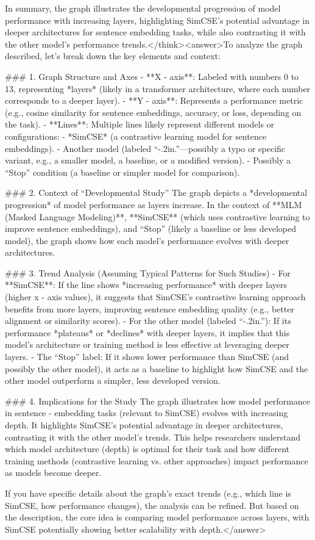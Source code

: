 In summary, the graph illustrates the developmental progression of model performance with increasing layers, highlighting SimCSE's potential advantage in deeper architectures for sentence embedding tasks, while also contrasting it with the other model's performance trends.</think><answer>To analyze the graph described, let’s break down the key elements and context:  


### 1. Graph Structure and Axes  
- **X - axis**: Labeled with numbers 0 to 13, representing *layers* (likely in a transformer architecture, where each number corresponds to a deeper layer).  
- **Y - axis**: Represents a performance metric (e.g., cosine similarity for sentence embeddings, accuracy, or loss, depending on the task).  
- **Lines**: Multiple lines likely represent different models or configurations:  
  - *SimCSE* (a contrastive learning model for sentence embeddings).  
  - Another model (labeled “-.2in.”—possibly a typo or specific variant, e.g., a smaller model, a baseline, or a modified version).  
  - Possibly a “Stop” condition (a baseline or simpler model for comparison).  


### 2. Context of “Developmental Study”  
The graph depicts a *developmental progression* of model performance as layers increase. In the context of **MLM (Masked Language Modeling)**, **SimCSE** (which uses contrastive learning to improve sentence embeddings), and “Stop” (likely a baseline or less developed model), the graph shows how each model’s performance evolves with deeper architectures.  


### 3. Trend Analysis (Assuming Typical Patterns for Such Studies)  
- For **SimCSE**: If the line shows *increasing performance* with deeper layers (higher x - axis values), it suggests that SimCSE’s contrastive learning approach benefits from more layers, improving sentence embedding quality (e.g., better alignment or similarity scores).  
- For the other model (labeled “-.2in.”): If its performance *plateaus* or *declines* with deeper layers, it implies that this model’s architecture or training method is less effective at leveraging deeper layers.  
- The “Stop” label: If it shows lower performance than SimCSE (and possibly the other model), it acts as a baseline to highlight how SimCSE and the other model outperform a simpler, less developed version.  


### 4. Implications for the Study  
The graph illustrates how model performance in sentence - embedding tasks (relevant to SimCSE) evolves with increasing depth. It highlights SimCSE’s potential advantage in deeper architectures, contrasting it with the other model’s trends. This helps researchers understand which model architecture (depth) is optimal for their task and how different training methods (contrastive learning vs. other approaches) impact performance as models become deeper.  


If you have specific details about the graph’s exact trends (e.g., which line is SimCSE, how performance changes), the analysis can be refined. But based on the description, the core idea is comparing model performance across layers, with SimCSE potentially showing better scalability with depth.</answer>